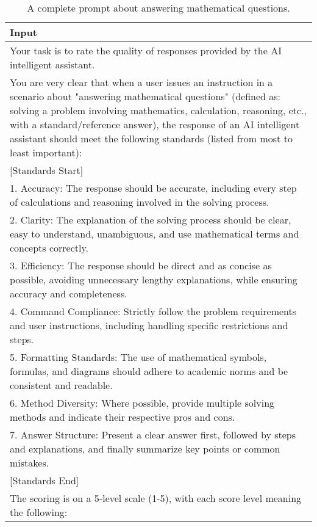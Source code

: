 \begin{table*}[tbh!]
  \caption{A complete prompt about answering mathematical questions.}
  \label{tab: math example}
  \small
  \begin{tabularx}{\textwidth}{X}
    \toprule
    Input \\ \midrule
    Your task is to rate the quality of responses provided by the AI intelligent assistant.\\
    You are very clear that when a user issues an instruction in a scenario about "answering mathematical questions" (defined as: solving a problem involving mathematics, calculation, reasoning, etc., with a standard/reference answer), the response of an AI intelligent assistant should meet the following standards (listed from most to least important):\\
    
    [Standards Start]\\
    
    1. Accuracy: The response should be accurate, including every step of calculations and reasoning involved in the solving process.\\
    2. Clarity: The explanation of the solving process should be clear, easy to understand, unambiguous, and use mathematical terms and concepts correctly.\\
    3. Efficiency: The response should be direct and as concise as possible, avoiding unnecessary lengthy explanations, while ensuring accuracy and completeness.\\
    4. Command Compliance: Strictly follow the problem requirements and user instructions, including handling specific restrictions and steps.\\
    5. Formatting Standards: The use of mathematical symbols, formulas, and diagrams should adhere to academic norms and be consistent and readable.\\
    6. Method Diversity: Where possible, provide multiple solving methods and indicate their respective pros and cons.\\
    7. Answer Structure: Present a clear answer first, followed by steps and explanations, and finally summarize key points or common mistakes.\\
    
    [Standards End]\\
    
    The scoring is on a 5-level scale (1-5), with each score level meaning the following:\\
    

\end{tabularx}
\end{table*}
